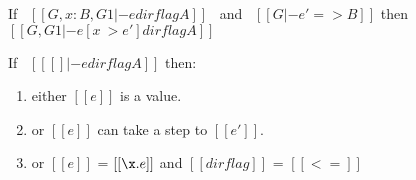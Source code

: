 \begin{comment}
\begin{proof}
  By induction on typing relation and subsequent inverting reduction relation.
  \begin{itemize}
    \item Cases \rref{typ-int, typ-var, typ-sub, typ-abs} are trivial to prove.
    \item Case \rref{typ-ann} requires helping \cref{lemma:union:check-pexpr-ann}.
    \item Case \rref{typ-app} requires helping \cref{lemma:union:pexpr-check-sub}
          and substitution \cref{lemma:union:substitution} for beta reduction.
    \item Case \rref{typ-typeof} requires substitution \cref{lemma:union:substitution}.
  \end{itemize}
\end{proof}

\baber{ToDo: change name of helping lemmas.}

\begin{lemma}[check-pexpr-ann]
\label{lemma:union:check-pexpr-ann}
  If \ $[[G |- p:C <= A]]$ \ then \ $[[G |- p <= A]]$.
\end{lemma}

\begin{lemma}[pexpr-check-sub]
\label{lemma:union:pexpr-check-sub}
  If \ $[[G |- p <= A]]$ \ and \ $[[A <: B]]$ \ then \ $[[G |- p <= B]]$.
\end{lemma}
\end{comment}

\begin{lemma}[Substitution]
\label{lemma:union:substitution}
  If \ $[[G, x:B , G1 |- e dirflag A]]$ \ and \ $[[G |- e' => B]]$
  then \ $[[G, G1 |- e [ x ~> e' ] dirflag A]]$
\end{lemma}

\begin{lemma}[Progress]
\label{lemma:union:progress}
If \ $[[ [] |- e dirflag A]]$ then:
 \begin{enumerate}
  \item either $[[e]]$ is a value.
  \item or $[[e]]$ can take a step to $[[e']]$.
  \item or $[[e]]$ = $[[\x.e]]$ and $[[dirflag]]$ = $[[<=]]$
  \end{enumerate}
\end{lemma}

